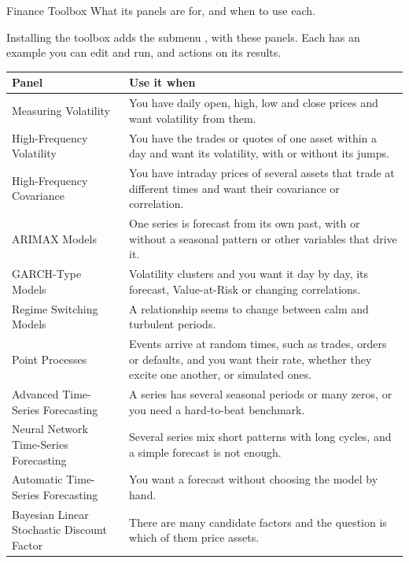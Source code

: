
\renewcommand{\vignetteauthor}{Pollis}
\renewcommand{\vignettedate}{11 November 2026}
\renewcommand{\vignettelicense}{AGPL-3.0}



  {Finance Toolbox}
  {What its panels are for, and when to use each.}

Installing the toolbox adds the submenu , with these panels. Each has an example you can edit and run, and actions on its results.

\medskip
{\small
\begin{tabularx}{\linewidth}{@{}>{\raggedright\arraybackslash}p{62mm}X@{}}
\toprule
\textbf{Panel} & \textbf{Use it when} \\\midrule
Measuring Volatility & You have daily open, high, low and close prices and want volatility from them. \\
High-Frequency Volatility & You have the trades or quotes of one asset within a day and want its volatility, with or without its jumps. \\
High-Frequency Covariance & You have intraday prices of several assets that trade at different times and want their covariance or correlation. \\
ARIMAX Models & One series is forecast from its own past, with or without a seasonal pattern or other variables that drive it. \\
GARCH-Type Models & Volatility clusters and you want it day by day, its forecast, Value-at-Risk or changing correlations. \\
Regime Switching Models & A relationship seems to change between calm and turbulent periods. \\
Point Processes & Events arrive at random times, such as trades, orders or defaults, and you want their rate, whether they excite one another, or simulated ones. \\
Advanced Time-Series Forecasting & A series has several seasonal periods or many zeros, or you need a hard-to-beat benchmark. \\
Neural Network Time-Series Forecasting & Several series mix short patterns with long cycles, and a simple forecast is not enough. \\
Automatic Time-Series Forecasting & You want a forecast without choosing the model by hand. \\
Bayesian Linear Stochastic Discount Factor & There are many candidate factors and the question is which of them price assets. \\

\end{tabularx}}
